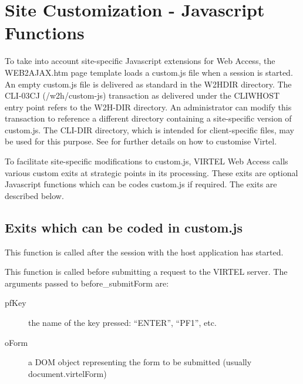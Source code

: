 \documentclass[letterpaper,10pt,english]{sphinxmanual}
\begin{document}
\section{Site Customization - Javascript Functions}
\label{\detokenize{User_Guide:site-customization-javascript-functions}}\label{\detokenize{User_Guide:v457ug-customization-javascript-functions}}
To take into account site-specific Javascript extensions for Web Access, the WEB2AJAX.htm page template loads a custom.js file when a session is started. An empty custom.js file is delivered as standard in the W2HDIR directory. The CLI-03CJ (/w2h/custom-js) transaction as delivered under the CLIWHOST entry point refers to the W2H-DIR directory. An administrator can modify this transaction to reference a different directory containing a site-specific version of custom.js. The CLI-DIR directory, which is intended for client-specific files, may be used for this purpose. See {\hyperref[\detokenize{User_Guide:v457ug-customizing-with-option}]{}} for further details on how to customise Virtel.

To facilitate site-specific modifications to custom.js, VIRTEL Web Access calls various custom exits at strategic points in its processing. These exits are optional Javascript functions which can be codes custom.js if required. The exits are described below.


\subsection{Exits which can be coded in custom.js}
\label{\detokenize{User_Guide:exits-which-can-be-coded-in-custom-js}}
\begin{sphinxVerbatim}[commandchars=\\\{\}]
\end{sphinxVerbatim}

This function is called after the session with the host application has started.

\begin{sphinxVerbatim}[commandchars=\\\{\}]
\end{sphinxVerbatim}

This function is called before submitting a request to the VIRTEL server. The arguments passed to before\_submitForm are:
\begin{description}
\item[{pfKey}] \leavevmode
the name of the key pressed: “ENTER”, “PF1”, etc.

\item[{oForm}] \leavevmode
a DOM object representing the form to be submitted (usually document.virtelForm)

\end{description}
\end{document}

